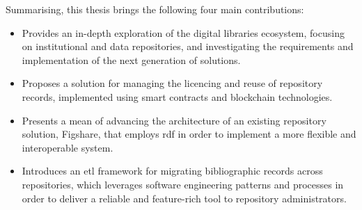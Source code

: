 Summarising, this thesis brings the following four main contributions:
\begin{itemize}
    \item Provides an in-depth exploration of the digital libraries ecosystem, focusing on institutional and data repositories, and investigating the requirements and implementation of the next generation of solutions.
    \item Proposes a solution for managing the licencing and reuse of repository records, implemented using smart contracts and blockchain technologies.
    \item Presents a mean of advancing the architecture of an existing repository solution, Figshare, that employs \gls{rdf} in order to implement a more flexible and interoperable system.
    \item Introduces an \gls{etl} framework for migrating bibliographic records across repositories, which leverages software engineering patterns and processes in order to deliver a reliable and feature-rich tool to repository administrators.
\end{itemize}

